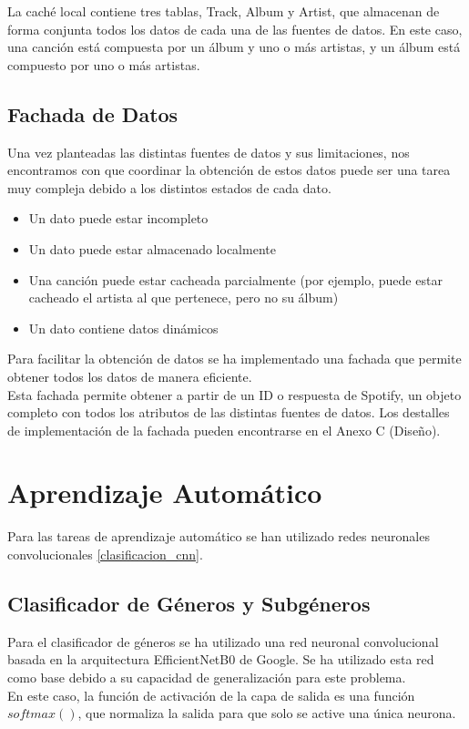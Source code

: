 La caché local contiene tres tablas, Track, Album y Artist, que almacenan de
forma conjunta todos los datos de cada una de las fuentes de datos.
En este caso, una canción está compuesta por un álbum y uno o más
artistas, y un álbum está compuesto por uno o más artistas.


\subsection{Fachada de Datos}\label{fachada-de-datos}

Una vez planteadas las distintas fuentes de datos y sus limitaciones,
nos encontramos con que coordinar la obtención de estos datos puede ser
una tarea muy compleja debido a los distintos estados de cada dato.

\begin{itemize}
\itemsep0em
\item
  Un dato puede estar incompleto
\item
  Un dato puede estar almacenado localmente
\item
  Una canción puede estar cacheada parcialmente (por ejemplo, puede
  estar cacheado el artista al que pertenece, pero no su álbum)
\item
  Un dato contiene datos dinámicos
\end{itemize}

Para facilitar la obtención de datos se ha implementado una fachada que
permite obtener todos los datos de manera eficiente.\\
Esta fachada permite obtener a partir de un ID o respuesta de Spotify,
un objeto completo con todos los atributos de las distintas fuentes de
datos.
Los destalles de implementación de la fachada pueden encontrarse en el Anexo C (Diseño).

\section{Aprendizaje Automático}
Para las tareas de aprendizaje automático se han utilizado redes neuronales convolucionales \ref{clasificacion_cnn}.

\subsection{Clasificador de Géneros y Subgéneros}
Para el clasificador de géneros se ha utilizado una red neuronal convolucional basada en la arquitectura EfficientNetB0 \cite{efficientnet} de Google. Se ha utilizado esta red como base debido a su capacidad de generalización para este problema.\\
En este caso, la función de activación de la capa de salida es una función $softmax()$, que normaliza la salida para que solo se active una única neurona. 

